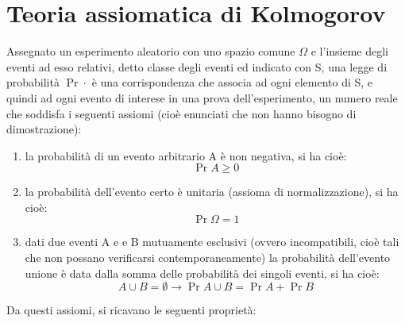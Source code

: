 \newpage 

\section{Teoria assiomatica di Kolmogorov}

Assegnato un esperimento aleatorio con uno spazio comune $\Omega$ e l'insieme degli eventi ad esso relativi, 
detto classe degli eventi ed indicato con S, una legge di probabilità $ \Pr{\cdot} $ è una corrispondenza che associa ad ogni elemento di S, e quindi ad ogni evento di interese in una prova dell'esperimento, 
un numero reale che soddisfa i seguenti assiomi (cioè enunciati che non hanno bisogno di dimostrazione): 

\begin{enumerate}
    \item la probabilità di un evento arbitrario A è non negativa, si ha cioè: 
    {
        \Large 
        \begin{equation}
            \Pr{A} \geq 0
        \end{equation}
    }

    \item la probabilità dell'evento certo è unitaria (assioma di normalizzazione), si ha cioè: 
    {
        \Large 
        \begin{equation}
            \Pr{\Omega} = 1
        \end{equation}
    } 

    \item dati due eventi A e e B mutuamente esclusivi 
    (ovvero incompatibili, cioè tali che non possano verificarsi contemporaneamente) la probabilità dell'evento unione è data dalla somma delle probabilità dei singoli eventi, si ha cioè: 
    {
        \Large 
        \begin{equation}
            A \cup B = \emptyset 
            \rightarrow 
            \Pr{A \cup B} = \Pr{A} + \Pr{B}
        \end{equation}
    }
\end{enumerate}

Da questi assiomi, si ricavano le seguenti proprietà: 

